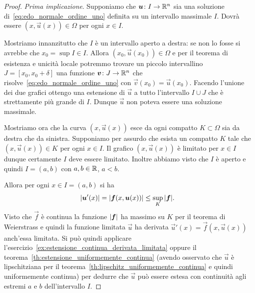 \begin{proof}
\emph{Prima implicazione}.
Supponiamo che $\boldsymbol u\colon I \to {\mathbb R}^n$ sia una soluzione di~\eqref{eq:edo_normale_ordine_uno} 
definita su un intervallo massimale $I$. Dovrà essere $(x,\vec u(x))\in \Omega$ per ogni $x\in I$.

Mostriamo innanzitutto
che $I$ è un intervallo aperto a destra: se non lo fosse si avrebbe che $x_0=\sup I \in I$. 
Allora $(x_0,\vec u(x_0))\in \Omega$ e per il teorema di esistenza e unicità locale
potremmo trovare un piccolo intervallino $J=[x_0,x_0+\delta]$ una funzione
$\boldsymbol v\colon J\to {\mathbb R}^n$ che risolve~\eqref{eq:edo_normale_ordine_uno}
con $\vec v(x_0)=\vec u(x_0)$.
Facendo l'unione dei due grafici ottengo una estensione di $\vec u$ a tutto l'intervallo
$I\cup J$ che è strettamente più grande di $I$. 
Dunque $\vec u$ non poteva essere una soluzione massimale.

Mostriamo ora che la curva $(x,\vec u(x))$ esce da ogni compatto $K\subset \Omega$ sia da destra che da sinistra. 
Supponiamo per assurdo che esista un compatto $K$ tale che $(x,\vec u(x))\in K$ per ogni $x\in I$.
Il grafico $(x,\vec u(x))$ è limitato per $x\in I$ dunque certamente $I$ deve essere limitato. 
Inoltre abbiamo visto che $I$ è aperto e quindi $I=(a,b)$ con $a,b\in {\mathbb R}$, $a<b$.

Allora per ogni $x\in I=(a,b)$ si ha
\[
  {\left|\boldsymbol u'(x)\right|} = {\left|\boldsymbol f(x, \boldsymbol u(x))\right|}
   \le \sup_K {\left|\boldsymbol f\right|}.
\]
Visto che $\vec f$ è continua 
la funzione ${\left|\boldsymbol f\right|}$ ha massimo su $K$ per il teorema di Weierstrass 
e quindi la funzione limitata $\vec u$ ha derivata $\vec u'(x)=\vec f(x,\vec u(x))$ 
anch'essa limitata. 
Si può quindi applicare l'esercizio~\ref{ex:estensione_continua_derivata_limitata}
oppure il teorema~\ref{th:estensione_uniformemente_continua} 
(avendo osservato che $\vec u$ è lipschitziana per il teorema~\ref{th:lipschitz_uniformemente_continua}
e quindi uniformemente continua)
per dedurre che $\vec u$ può essere estesa con continuità
agli estremi $a$ e $b$ dell'intervallo $I$.


\end{proof}
